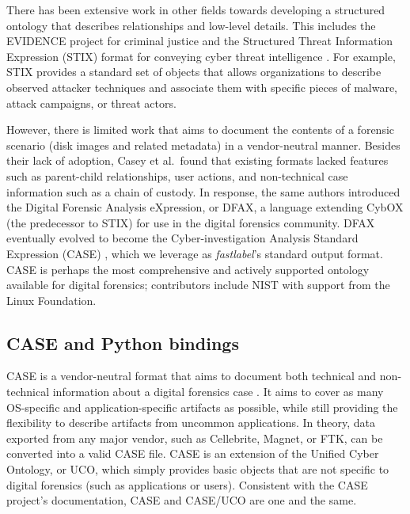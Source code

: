 There has been extensive work in other fields towards developing a
structured ontology that describes relationships and low-level details.
This includes the EVIDENCE project for criminal justice and the
Structured Threat Information Expression (STIX) format for conveying
cyber threat intelligence
\cite{caseyLeveragingCybOXStandardize2015}. For example, STIX
provides a standard set of objects that allows organizations to describe
observed attacker techniques and associate them with specific pieces of
malware, attack campaigns, or threat actors.

However, there is limited work that aims to document the contents of a
forensic scenario (disk images and related metadata) in a vendor-neutral
manner. Besides their lack of adoption, Casey et al.~found that existing
formats lacked features such as parent-child relationships, user
actions, and non-technical case information such as a chain of custody.
In response, the same authors introduced the Digital Forensic Analysis
eXpression, or DFAX, a language extending CybOX (the predecessor to
STIX) for use in the digital forensics community. DFAX eventually
evolved to become the Cyber-investigation Analysis Standard Expression
(CASE) \cite{caseyAdvancingCoordinatedCyberinvestigations2017},
which we leverage as \emph{fastlabel}'s standard output format. CASE is
perhaps the most comprehensive and actively supported ontology available
for digital forensics; contributors include NIST with support from the
Linux Foundation.

\subsection{CASE and Python
bindings}\label{case-and-python-bindings}

CASE is a vendor-neutral format that aims to document both technical and
non-technical information about a digital forensics case
\cite{caseyAdvancingCoordinatedCyberinvestigations2017}. It aims to
cover as many OS-specific and application-specific artifacts as
possible, while still providing the flexibility to describe artifacts
from uncommon applications. In theory, data exported from any major
vendor, such as Cellebrite, Magnet, or FTK, can be converted into a
valid CASE file. CASE is an extension of the Unified Cyber Ontology, or
UCO, which simply provides basic objects that are not specific to
digital forensics (such as applications or users). Consistent with the
CASE project's documentation, CASE and CASE/UCO are one and the same.

